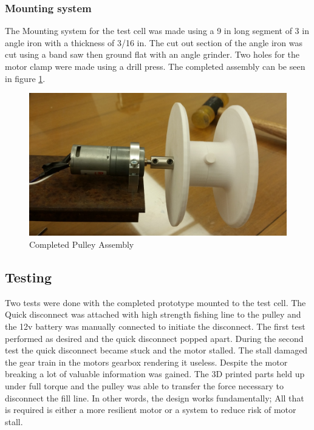 \documentclass[10pt,a4paper]{article}
\begin{document}
\subsubsection{Mounting system}
The Mounting system for the test cell was made using a 9 in long segment of 3 in angle iron with a thickness of 3/16 in. The cut out section of the angle iron was cut using a band saw then ground flat with an angle grinder. Two holes for the motor clamp were made using a drill press. The completed assembly can be seen in figure  \ref{fig:qd_completed}.

\begin{figure}[h!]
	\centering
	\includegraphics[width=.9\textwidth]{./figs/qd_completed.jpg}
	\caption{Completed Pulley Assembly}
	\label{fig:qd_completed}
\end{figure}

\subsection{Testing}

Two tests were done with the completed prototype mounted to the test cell. The Quick disconnect was attached with high strength fishing line to the pulley and the 12v battery was manually connected to initiate the disconnect. The first test performed as desired and the quick disconnect popped apart. During the second test the quick disconnect became stuck and the motor stalled. The stall damaged the gear train in the motors gearbox rendering it useless. Despite the motor breaking a lot of valuable information was gained. The 3D printed parts held up under full torque and the pulley was able to transfer the force necessary to disconnect the fill line. In other words, the design works fundamentally; All that is required is either a more resilient motor or a system to reduce risk of motor stall.
\end{document}
